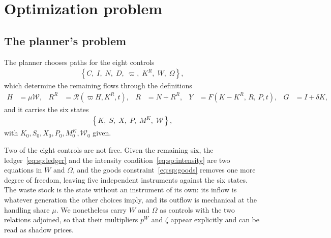 \section{Optimization problem}\label{sec:sp:opt}

\subsection{The planner's problem}\label{sec:sp:opt:problem}

 The planner chooses paths for the eight controls
\begin{align}
    \left\{C,\;I,\;N,\;D,\;\varpi,\;K^R,\;W,\;\Omega\right\},
\label{eq:sp:controls}
\end{align}
which determine the remaining flows through the definitions
\begin{align}
H &= \mu\mathcal W,
&
R^R &= \mathcal R\left(\varpi H,K^R, t\right),
&
R &= N+R^R,
&
Y &= F\left(K-K^R,\,R,\,P, t\right),
&
G &= I+\delta K,
\label{eq:sp:definitions}
\end{align}
and it carries the six states
\begin{align}
\left\{K,\;S,\;X,\;P,\;M^K,\;\mathcal W\right\},
\label{eq:sp:states}
\end{align}
with $K_0,S_0,X_0,P_0,M^K_0,\mathcal W_0$ given.

Two of the eight controls are not free. Given the remaining six, the ledger~\eqref{eq:sp:ledger} and the intensity condition~\eqref{eq:sp:intensity} are two equations in $W$ and $\Omega$, and the goods constraint~\eqref{eq:sp:goods} removes one more degree of freedom, leaving five independent instruments against the six states. The waste stock is the state without an instrument of its own: its inflow is whatever generation the other choices imply, and its outflow is mechanical at the handling share $\mu$. We nonetheless carry $W$ and $\Omega$ as controls with the two relations adjoined, so that their multipliers $p^W$ and $\zeta$ appear explicitly and can be read as shadow prices.


